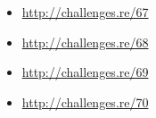 \sectionold{\Exercises}

\begin{itemize}
	\item \url{http://challenges.re/67}
	\item \url{http://challenges.re/68}
	\item \url{http://challenges.re/69}
	\item \url{http://challenges.re/70}
\end{itemize}

